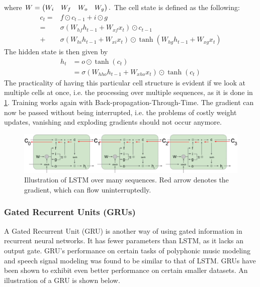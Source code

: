 \documentclass[main]{subfiles}
\begin{document}
where $W = \begin{pmatrix}W_i& W_f& W_o& W_g\end{pmatrix}.$ The cell state is defined as the following:
\begin{align*}
    c_t = & f \odot c_{t-1} + i \odot g \\ \tag{4}
    = &\sigma ( W_{hf} h_{t-1} + W_{xf} x_t ) \odot c_{t-1}\\ 
    + &\sigma ( W_{hi} h_{t-1} + W_{xi} x_t ) \odot \tanh (W_{hg} h_{t-1} + W_{xg} x_t)
\end{align*}
The hidden state is then given by 
\begin{align*}
    h_t &= o \odot \tanh(c_t)\\ \tag{5}
    &= \sigma (W_{hho} h_{t-1} + W_{xho} x_t ) \odot \tanh(c_t)
\end{align*}
The practicality of having this particular cell structure is evident if we look at multiple cells at once, i.e. the processing over multiple sequences, as it is done in \cref{fig:lstm_many}. Training works again with Back-propagation-Through-Time. The gradient can now be passed without being interrupted, i.e. the problems of costly weight updates, vanishing and exploding gradients should not occur anymore. 
\begin{figure}[H]
    \centering
    \includegraphics[width=0.99\linewidth]{13_LearningInRecurrentNeuronalNetworks/figures/lstm_many.png}
    \caption{Illustration of LSTM over many sequences. Red arrow denotes the gradient, which can flow uninterruptedly.}
    \label{fig:lstm_many}
\end{figure}

\subsubsection{Gated Recurrent Units (GRUs)}
A Gated Recurrent Unit (GRU) is another way of using gated information in recurrent neural networks. It has fewer parameters than LSTM, as it lacks an output gate. GRU's performance on certain tasks of polyphonic music modeling and speech signal modeling was found to be similar to that of LSTM. GRUs have been shown to exhibit even better performance on certain smaller datasets. An illustration of a GRU is shown below. 
\end{document}
